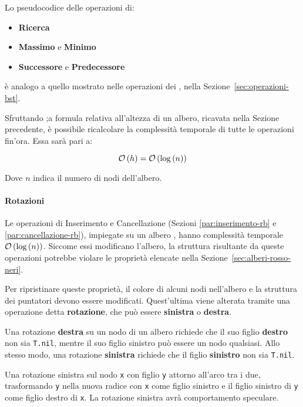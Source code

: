 \documentclass[italian, 10pt]{article}
\begin{document}
Lo pseudocodice delle operazioni di:

\begin{itemize}
  \item \textbf{Ricerca}
  \item \textbf{Massimo} e \textbf{Minimo}
  \item \textbf{Successore} e \textbf{Predecessore}
\end{itemize}

è analogo a quello mostrato nelle operazioni dei \BST, nella Sezione~\ref{sec:operazioni-bst}.

Sfruttando ;a formula relativa all'altezza di un albero, ricavata nella Sezione precedente, è possibile ricalcolare la complessità temporale di tutte le operazioni fin'ora.
Essa sarà pari a:

\[ \mathcal{O}\left(h\right) = \mathcal{O}\left(\log{(n)}\right)\]

Dove \(n\) indica il numero di nodi dell'albero.

\paragraph{Rotazioni}
\label{par:rotazioni-rb}

Le operazioni di Inserimento e Cancellazione (Sezioni \ref{par:inserimento-rb} e \ref{par:cancellazione-rb}), impiegate su un albero \RB, hanno complessità temporale \(\mathcal{O}\left(\log{(n)}\right)\).
Siccome essi modificano l'albero, la struttura risultante da queste operazioni potrebbe violare le proprietà elencate nella Sezione~\ref{sec:alberi-rosso-neri}.

Per ripristinare queste proprietà, il colore di alcuni nodi nell'albero e la struttura dei puntatori devono essere modificati.
Quest'ultima viene alterata tramite una operazione detta \textbf{rotazione}, che può essere \textbf{sinistra} o \textbf{destra}.

Una rotazione \textbf{destra} su un nodo di un albero \RB richiede che il suo figlio \textbf{destro} non sia \texttt{T.nil}, mentre il suo figlio sinistro può essere un nodo qualsiasi.
Allo stesso modo, una rotazione \textbf{sinistra} richiede che il figlio \textbf{sinistro} non sia \texttt{T.nil}.

Una rotazione sinistra sul nodo \texttt{x} con figlio \texttt{y}  attorno all'arco tra i due, trasformando \texttt{y} nella nuova radice con \texttt{x} come figlio sinistro e il figlio sinistro di \texttt{y} come figlio destro di \texttt{x}.
La rotazione sinistra avrà comportamento speculare.
\end{document}
